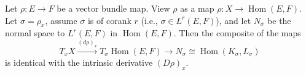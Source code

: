 Let $\rho : E \to F$ be a vector bundle map. View $\rho$ as a map $\rho : X \to \operatorname{Hom}(E, F)$. Let $\sigma = \rho_x$, assume $\sigma$ is of corank $r$ (i.e., $\sigma \in L^r(E, F)$), and let $N_\sigma$ be the normal space to $L^r(E, F)$ in $\operatorname{Hom}(E, F)$. Then the composite of the maps
$$
T_x X \xrightarrow{(d\rho)_x} T_\sigma \operatorname{Hom}(E, F) \longrightarrow N_\sigma \cong \operatorname{Hom}(K_\sigma, L_\sigma)
$$
is identical with the intrinsic derivative $(D\rho)_x$.
